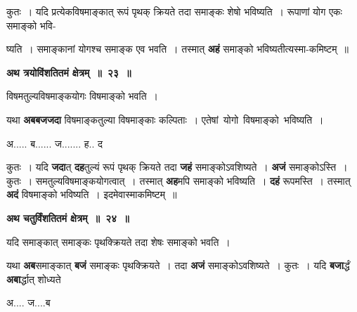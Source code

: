 \documentclass[11pt, openany]{book}
\begin{document}
\noindent कुतः~। यदि प्रत्येकविषमाङ्कात् रूपं पृथक् क्रियते तदा समाङ्कः शेषो भविष्यति~। रूपाणां योग एकः समाङ्को भवि-
 
\newpage
\noindent ष्यति~। समाङ्कानां योगश्च समाङ्क एव भवति~। तस्मात् \textbf{अहं} समाङ्को भविष्यतीत्यस्मा-कमिष्टम्~॥ 
\vspace{2mm}

\begin{center}
\textbf{अथ त्रयोविंशतितमं क्षेत्रम्~॥~२३~॥}
\end{center}

{\ab विषमतुल्यविषमाङ्कयोगः विषमाङ्को भवति~। }

\begin{flushleft}
\begin{minipage}[t]{0.55\textwidth}
\hspace{4mm} यथा \textbf{अबबजजदा} विषमाङ्कतुल्या विषमाङ्काः कल्पिताः~। एतेषां \,योगो \,विषमाङ्को \,भविष्यति~।
\end{minipage} 
\hfill
\begin{minipage}[t]{0.35\textwidth}
अ..... ब...... ज....... ह.. द
\end{minipage}
\end{flushleft}
\vspace{-3mm}

\noindent कुतः~। यदि \textbf{जदा}त् \textbf{दह}तुल्यं रूपं पृथक् क्रियते तदा \textbf{जहं} समाङ्कोऽवशिष्यते~। \textbf{अजं} समाङ्कोऽस्ति~।  कुतः~। समतुल्यविषमाङ्कयोगत्वात्~। तस्मात् \textbf{अह}मपि समाङ्को भविष्यति~। \textbf{दहं} रूपमस्ति~। तस्मात् \textbf{अदं} विषमाङ्को भविष्यति~। इदमेवास्माकमिष्टम्~॥ 
 \vspace{2mm}

\begin{center}
\textbf{\large अथ चतुर्विंशतितमं क्षेत्रम्~॥~२४~॥}
\end{center}
 
 {\ab यदि समाङ्कात् समाङ्कः पृथक्क्रियते तदा शेषः समाङ्को भवति~। }

\begin{flushleft}
\begin{minipage}[t]{0.7\textwidth}
\hspace{4mm} यथा \textbf{अब}समाङ्कात् \textbf{बजं} समाङ्कः पृथक्क्रियते~। तदा \textbf{अजं} समाङ्कोऽवशिष्यते~। कुतः~। यदि \textbf{बजा}र्द्धं \textbf{अबा}र्द्धात् शोध्यते
\end{minipage} 
\hfill
\begin{minipage}[t]{0.2\textwidth}
अ.... ज....ब
\end{minipage}
\end{flushleft}
\vspace{-3mm}
\end{document}
